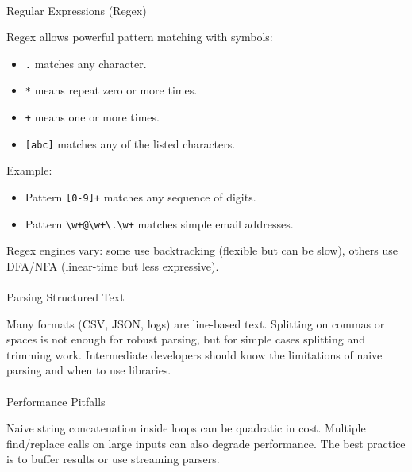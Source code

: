 \documentclass[
  letterpaper,
  DIV=11,
  numbers=noendperiod]{scrreprt}
\makeatletter
\let\oldparagraph\paragraph
\renewcommand{\paragraph}{
    \@ifstar
      \xxxParagraphStar
      \xxxParagraphNoStar
  }
\newcommand{\xxxParagraphStar}[1]{\oldparagraph*{#1}\mbox{}}
\newcommand{\xxxParagraphNoStar}[1]{\oldparagraph{#1}\mbox{}}
\providecommand{\tightlist}{%
  \setlength{\itemsep}{0pt}\setlength{\parskip}{0pt}}
\makeatother
\begin{document}
\paragraph{Regular Expressions (Regex)}\label{regular-expressions-regex}

Regex allows powerful pattern matching with symbols:

\begin{itemize}
\tightlist
\item
  \texttt{.} matches any character.
\item
  \texttt{*} means repeat zero or more times.
\item
  \texttt{+} means one or more times.
\item
  \texttt{{[}abc{]}} matches any of the listed characters.
\end{itemize}

Example:

\begin{itemize}
\tightlist
\item
  Pattern \texttt{{[}0-9{]}+} matches any sequence of digits.
\item
  Pattern
  \texttt{\textbackslash{}w+@\textbackslash{}w+\textbackslash{}.\textbackslash{}w+}
  matches simple email addresses.
\end{itemize}

Regex engines vary: some use backtracking (flexible but can be slow),
others use DFA/NFA (linear-time but less expressive).

\paragraph{Parsing Structured Text}\label{parsing-structured-text}

Many formats (CSV, JSON, logs) are line-based text. Splitting on commas
or spaces is not enough for robust parsing, but for simple cases
splitting and trimming work. Intermediate developers should know the
limitations of naive parsing and when to use libraries.

\paragraph{Performance Pitfalls}\label{performance-pitfalls}

Naive string concatenation inside loops can be quadratic in cost.
Multiple find/replace calls on large inputs can also degrade
performance. The best practice is to buffer results or use streaming
parsers.
\end{document}

